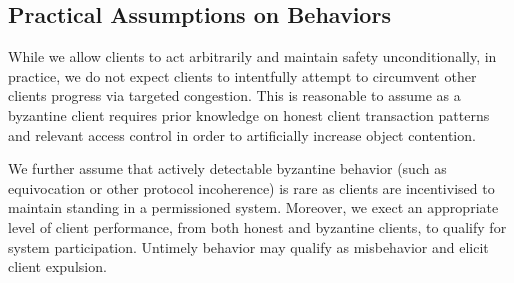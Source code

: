 \subsection{Practical Assumptions on Behaviors}
While we allow clients to act arbitrarily and maintain safety unconditionally, in practice, we do not expect clients to intentfully attempt to circumvent other clients progress via targeted congestion. This is reasonable to assume as a byzantine client requires prior knowledge on honest client transaction patterns and relevant access control in order to artificially increase object contention. 

We further assume that actively detectable byzantine behavior (such as equivocation or other protocol incoherence) is rare as clients are incentivised to maintain standing in a permissioned system. Moreover, we exect an appropriate level of client performance, from both honest and byzantine clients, to qualify for system participation. Untimely behavior may qualify as misbehavior and elicit client expulsion. 

